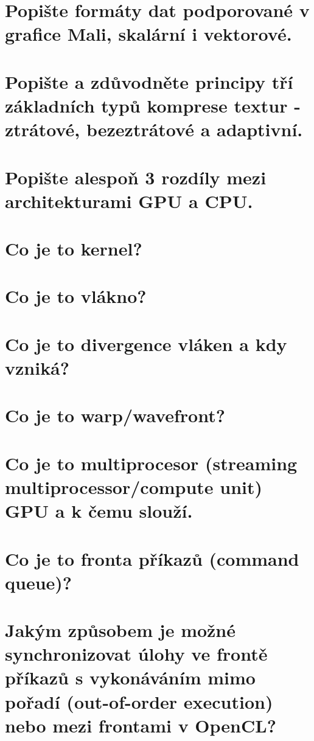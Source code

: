 	
\section{Popište formáty dat podporované v grafice Mali, skalární i vektorové.}
	\todo
	
	
\section{Popište a zdůvodněte principy tří základních typů komprese textur - ztrátové, bezeztrátové a adaptivní.}
	\todo
	
	
\section{Popište alespoň 3 rozdíly mezi architekturami GPU a CPU.}
	\todo
	

\section{Co je to kernel?}
	\todo


\section{Co je to vlákno?}
	\todo


\section{Co je to divergence vláken a kdy vzniká?}
	\todo


\section{Co je to warp/wavefront?}
	\todo


\section{Co je to multiprocesor (streaming multiprocessor/compute unit) GPU a k čemu slouží.}
	\todo


\section{Co je to fronta příkazů (command queue)?}
	\todo


\section{Jakým způsobem je možné synchronizovat úlohy ve frontě příkazů s vykonáváním mimo pořadí (out-of-order execution) nebo mezi frontami v OpenCL?}
	\todo


